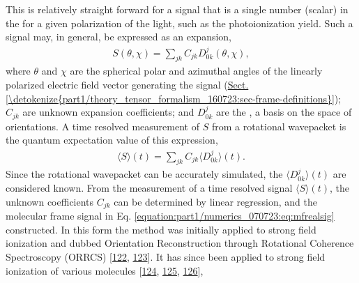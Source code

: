 \documentclass[letterpaper,table,10pt,english]{jupyterBook}
\begin{document}
\sphinxAtStartPar
This is relatively straight forward for a signal that is a single number (scalar) in the {\hyperref[\detokenize{backmatter/glossary:term-MF}]{}} for a given polarization of the light, such as the photoionization yield. Such a signal may, in general, be expressed as an expansion,
\begin{equation}\label{equation:part1/numerics_070723:eq:mfrealsig}
\begin{split}
S(\theta,\chi)=\sum_{jk}C_{jk}D^{j}_{0k}(\theta,\chi),
\end{split}
\end{equation}
\sphinxAtStartPar
where \(\theta\) and \(\chi\) are the {\hyperref[\detokenize{backmatter/glossary:term-MF}]{}} spherical polar and azimuthal angles of the linearly polarized electric field vector generating the signal (\hyperref[\detokenize{part1/theory_tensor_formalism_160723:sec-frame-definitions}]{Sect.\@ \ref{\detokenize{part1/theory_tensor_formalism_160723:sec-frame-definitions}}}); \(C_{jk}\) are unknown expansion coefficients; and \(D^{j}_{0k}\) are the {\hyperref[\detokenize{backmatter/glossary:term-Wigner-rotation-matrix-elements}]{}}, a basis on the space of orientations. A time resolved measurement of \(S\) from a rotational wavepacket is the quantum expectation value of this expression,
\begin{equation}\label{equation:part1/numerics_070723:eq:St-Cjk}
\begin{split}
\langle S \rangle(t) = \sum_{jk}C_{jk}\langle D^{j}_{0k} \rangle (t).
\end{split}
\end{equation}
\sphinxAtStartPar
Since the rotational wavepacket can be accurately simulated, the \(\langle D^{j}_{0k} \rangle (t)\) are considered known. From the measurement of a time resolved signal \(\langle S \rangle(t)\), the unknown coefficients \(C_{jk}\) can be determined by linear regression, and the molecular frame signal in Eq. \eqref{equation:part1/numerics_070723:eq:mfrealsig} constructed. In this form the method was initially applied to strong field ionization and dubbed Orientation Reconstruction through Rotational Coherence Spectroscopy (ORRCS) {[}\hyperlink{cite.backmatter/bibliography:id992}{122}, \hyperlink{cite.backmatter/bibliography:id991}{123}{]}.
It has since been applied to strong field ionization of various molecules {[}\hyperlink{cite.backmatter/bibliography:id993}{124}, \hyperlink{cite.backmatter/bibliography:id994}{125}, \hyperlink{cite.backmatter/bibliography:id997}{126}{]},
\end{document}
